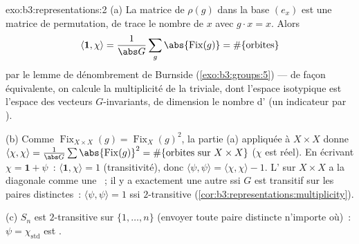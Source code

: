 \begin{solution}{exo:b3:representations:2}
(a) La matrice de $\rho(g)$ dans la base $(e_x)$ est une matrice
de permutation, de trace le nombre de $x$ avec $g\cdot x = x$.
Alors
\[
\langle\mathbf 1, \chi\rangle = \frac1{\abs G}\sum_g
\abs{\operatorname{Fix}(g)} = \#\{\text{orbites}\}
\]
par le lemme de dénombrement de Burnside (\cref{exo:b3:groups:5})
--- de façon équivalente, on calcule la multiplicité de la
 triviale, dont l'espace isotypique est l'espace
des vecteurs $G$-invariants, de dimension le nombre d'
(un indicateur par ).

(b) Comme $\operatorname{Fix}_{X\times X}(g) =
\operatorname{Fix}_X(g)^2$, la partie (a) appliquée à $X \times
X$ donne $\langle\chi,\chi\rangle = \frac1{\abs
G}\sum\abs{\operatorname{Fix}(g)}^2 = \#\{\text{orbites sur }
X\times X\}$ ($\chi$ est réel). En écrivant $\chi = \mathbf 1 +
\psi$~: $\langle\mathbf1,\chi\rangle = 1$ (transitivité), donc
$\langle\psi,\psi\rangle = \langle\chi,\chi\rangle - 1$. L'
sur $X\times X$ a la diagonale comme une ~; il y a
exactement une autre  ssi $G$ est transitif sur les paires
distinctes~: $\langle\psi,\psi\rangle = 1$ ssi $2$-transitive
(\cref{cor:b3:representations:multiplicity}).

(c) $S_n$ est $2$-transitive sur $\{1,\dots,n\}$ (envoyer toute
paire distincte n'importe où)~: $\psi = \chi_{\mathrm{std}}$ est
.
\end{solution}

